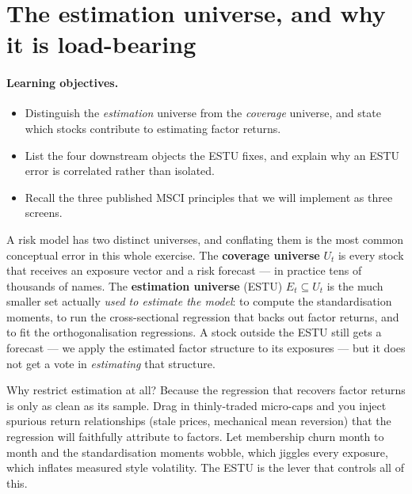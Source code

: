 \documentclass[11pt]{article}
\theoremstyle{definition}
\theoremstyle{plain}
\theoremstyle{remark}
\begin{document}
\tableofcontents
\bigskip

\section{The estimation universe, and why it is load-bearing}\label{sec:why}

\paragraph{Learning objectives.}
\begin{itemize}[nosep,leftmargin=1.4em]
  \item Distinguish the \emph{estimation} universe from the \emph{coverage} universe, and state which stocks contribute to estimating factor returns.
  \item List the four downstream objects the ESTU fixes, and explain why an ESTU error is correlated rather than isolated.
  \item Recall the three published MSCI principles that we will implement as three screens.
\end{itemize}

A risk model has two distinct universes, and conflating them is the most common conceptual error in this whole exercise. The \textbf{coverage universe} $U_t$ is every stock that receives an exposure vector and a risk forecast --- in practice tens of thousands of names. The \textbf{estimation universe} (ESTU) $E_t \subseteq U_t$ is the much smaller set actually \emph{used to estimate the model}: to compute the standardisation moments, to run the cross-sectional regression that backs out factor returns, and to fit the orthogonalisation regressions. A stock outside the ESTU still gets a forecast --- we apply the estimated factor structure to its exposures --- but it does not get a vote in \emph{estimating} that structure.

Why restrict estimation at all? Because the regression that recovers factor returns is only as clean as its sample. Drag in thinly-traded micro-caps and you inject spurious return relationships (stale prices, mechanical mean reversion) that the regression will faithfully attribute to factors. Let membership churn month to month and the standardisation moments wobble, which jiggles every exposure, which inflates measured style volatility. The ESTU is the lever that controls all of this.
\end{document}
